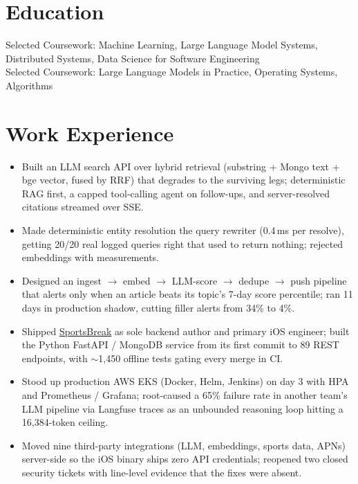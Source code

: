 \documentclass[11pt, letterpaper]{article}
\begin{document}

\section{Education}
Selected Coursework: Machine Learning, Large Language Model Systems, Distributed Systems, Data Science for Software Engineering\\[1pt]
Selected Coursework: Large Language Models in Practice, Operating Systems, Algorithms

\section{Work Experience}
\begin{itemize}
  \item Built an LLM search API over hybrid retrieval (substring + Mongo text + bge vector, fused by RRF) that degrades to the surviving legs; deterministic RAG first, a capped tool-calling agent on follow-ups, and server-resolved citations streamed over SSE.
  \item Made deterministic entity resolution the query rewriter (0.4\,ms per resolve), getting 20/20 real logged queries right that used to return nothing; rejected embeddings with measurements.
  \item Designed an ingest $\to$ embed $\to$ LLM-score $\to$ dedupe $\to$ push pipeline that alerts only when an article beats its topic's 7-day score percentile; ran 11 days in production shadow, cutting filler alerts from 34\% to 4\%.
  \item Shipped \href{https://apps.apple.com/app/id6762649287}{SportsBreak} as sole backend author and primary iOS engineer; built the Python FastAPI / MongoDB service from its first commit to 89 REST endpoints, with $\sim$1{,}450 offline tests gating every merge in CI.
  \item Stood up production AWS EKS (Docker, Helm, Jenkins) on day 3 with HPA and Prometheus / Grafana; root-caused a 65\% failure rate in another team's LLM pipeline via Langfuse traces as an unbounded reasoning loop hitting a 16{,}384-token ceiling.
  \item Moved nine third-party integrations (LLM, embeddings, sports data, APNs) server-side so the iOS binary ships zero API credentials; reopened two closed security tickets with line-level evidence that the fixes were absent.
\end{itemize}
\end{document}
